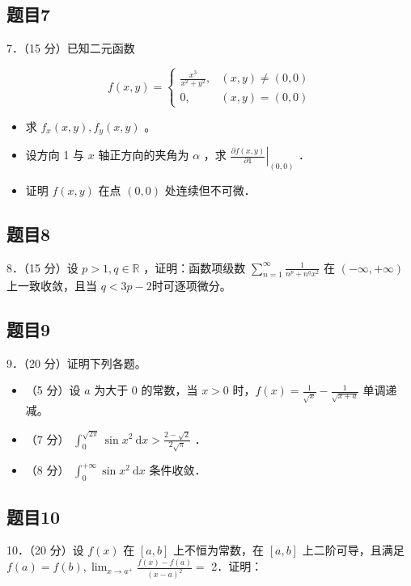 \documentclass{article}
\begin{document}
\subsection{题目7}
7．（15 分）已知二元函数

\[
f(x, y)= \begin{cases}\frac{x^{3}}{x^{2}+y^{2}}, & (x, y) \neq(0,0) \\ 0, & (x, y)=(0,0)\end{cases}
\]

\begin{itemize}
  \item[（1）] 求 \(f_{x}(x, y), f_{y}(x, y)\) 。
  \item[（2）] 设方向 1 与 \(x\) 轴正方向的夹角为 \(\alpha\) ，求 \(\left.\frac{\partial f(x, y)}{\partial 1}\right|_{(0,0)}\) ．
  \item[（3）] 证明 \(f(x, y)\) 在点 \((0,0)\) 处连续但不可微．
\end{itemize}

\subsection{题目8}
8．（15 分）设 \(p>1, q \in \mathbb{R}\) ，证明：函数项级数 \(\sum_{n=1}^{\infty} \frac{1}{n^{p}+n^{q} x^{2}}\) 在 \((-\infty,+\infty)\) 上一致收敛，且当 \(q<3 p-2\)时可逐项微分。

\subsection{题目9}
9．（20 分）证明下列各题。

\begin{itemize}
  \item[（1）] （5 分）设 \(a\) 为大于 0 的常数，当 \(x>0\) 时，\(f(x)=\frac{1}{\sqrt{x}}-\frac{1}{\sqrt{x+a}}\) 单调递减。
  \item[（2）] （7 分） \(\int_{0}^{\sqrt{2 \pi}} \sin x^{2} \mathrm{~d} x>\frac{2-\sqrt{2}}{2 \sqrt{\pi}}\) ．
  \item[（3）] （8 分） \(\int_{0}^{+\infty} \sin x^{2} \mathrm{~d} x\) 条件收敛．
\end{itemize}

\subsection{题目10}
10．（20 分）设 \(f(x)\) 在 \([a, b]\) 上不恒为常数，在 \([a, b]\) 上二阶可导，且满足 \(f(a)=f(b), \lim _{x \rightarrow a^{+}} \frac{f(x)-f(a)}{(x-a)^{2}}=\) 2．证明：
\end{document}
